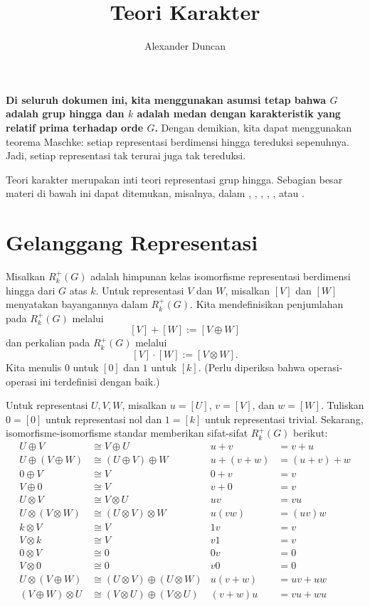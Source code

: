 \documentclass[12pt]{article}
\theoremstyle{plain}
\theoremstyle{definition}
\theoremstyle{remark}
\numberwithin{equation}{section}
\begin{document}
\title{Teori Karakter}
\author{Alexander Duncan}

\maketitle

{\bf
Di seluruh dokumen ini, kita menggunakan asumsi tetap bahwa $G$
adalah grup hingga dan $k$ adalah medan dengan karakteristik yang relatif prima terhadap
orde $G$.}
Dengan demikian, kita dapat menggunakan teorema Maschke:
setiap representasi berdimensi hingga tereduksi sepenuhnya.
Jadi, setiap representasi tak terurai juga tak tereduksi.

Teori karakter merupakan inti teori representasi grup hingga.
Sebagian besar materi di bawah ini dapat ditemukan, misalnya, dalam
\cite[\S{14--15}]{AlperinBell},
\cite[\S{18.3}]{DF},
\cite[\S{4}]{Etingof},
\cite[\S{2}]{FultonHarris},
\cite[\S{XVIII.1--5}]{Lang}, atau
\cite[\S{2}]{Serre}.

\section{Gelanggang Representasi}

Misalkan $R^+_k(G)$ adalah himpunan kelas isomorfisme
representasi berdimensi hingga dari $G$ atas $k$.
Untuk representasi $V$ dan $W$, misalkan $[V]$ dan $[W]$ menyatakan
bayangannya dalam $R^+_k(G)$.
Kita mendefinisikan penjumlahan pada $R^+_k(G)$ melalui
\[ [V] + [W] := [V \oplus W] \]
dan perkalian pada $R^+_k(G)$ melalui
\[ [V] \cdot [W] := [V \otimes W]. \]
Kita menulis $0$ untuk $[0]$ dan $1$ untuk $[k]$.
(Perlu diperiksa bahwa operasi-operasi ini terdefinisi dengan baik.)

Untuk representasi $U,V,W$, misalkan $u=[U]$, $v=[V]$, dan $w=[W]$.
Tuliskan $0 = [0]$ untuk representasi nol dan $1=[k]$
untuk representasi trivial.
Sekarang, isomorfisme-isomorfisme standar memberikan sifat-sifat $R^+_k(G)$ berikut:
\begin{align*}
U \oplus V &\cong V \oplus U & u+v&=v+u\\
U \oplus (V \oplus W) &\cong (U \oplus V) \oplus W & u+(v+w)&=(u+v)+w\\
0 \oplus V &\cong V & 0+v&=v\\
V \oplus 0 &\cong V & v+0&=v\\
U \otimes V &\cong V \otimes U & uv&=vu\\
U \otimes (V \otimes W) &\cong (U \otimes V) \otimes W & u(vw)&=(uv)w\\
k \otimes V &\cong V & 1v&=v\\
V \otimes k &\cong V & v1&=v\\
0 \otimes V &\cong 0 & 0v&=0\\
V \otimes 0 &\cong 0 & v0&=0\\
U \otimes (V \oplus W) &\cong (U \otimes V) \oplus (U \otimes W) &
u(v+w)&=uv+uw\\
(V \oplus W) \otimes U &\cong (V \otimes U) \oplus (V \otimes U) &
(v+w)u&=vu+wu
\end{align*}
\end{document}
